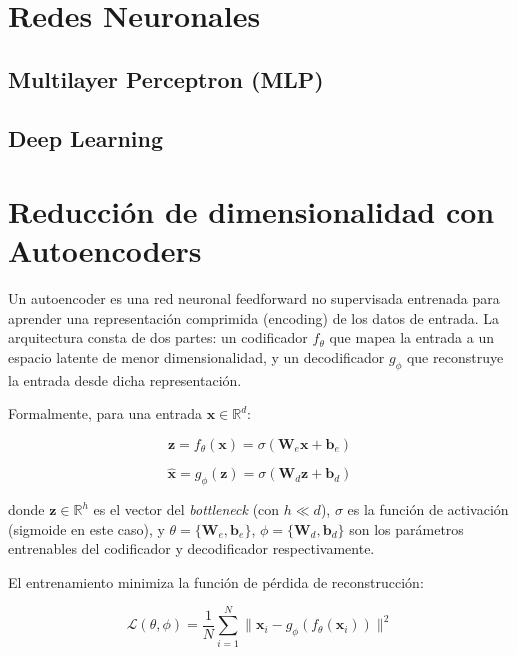 \documentclass[11pt, a4paper]{article}
\begin{document}
\section{Redes Neuronales}

\subsection{Multilayer Perceptron (MLP)}

\subsection{Deep Learning}

\section{Reducción de dimensionalidad con Autoencoders}

Un autoencoder es una red neuronal feedforward no supervisada entrenada para aprender una representación comprimida (encoding) de los datos de entrada. La arquitectura consta de dos partes: un codificador $f_\theta$ que mapea la entrada a un espacio latente de menor dimensionalidad, y un decodificador $g_\phi$ que reconstruye la entrada desde dicha representación.

Formalmente, para una entrada $\mathbf{x} \in \mathbb{R}^d$:

\begin{equation}
\mathbf{z} = f_\theta(\mathbf{x}) = \sigma(\mathbf{W}_e \mathbf{x} + \mathbf{b}_e)
\end{equation}

\begin{equation}
\hat{\mathbf{x}} = g_\phi(\mathbf{z}) = \sigma(\mathbf{W}_d \mathbf{z} + \mathbf{b}_d)
\end{equation}

 donde $\mathbf{z} \in \mathbb{R}^h$ es el vector del \textit{bottleneck} (con $h \ll d$), $\sigma$ es la función de activación (sigmoide en este caso), y $\theta = \{\mathbf{W}_e, \mathbf{b}_e\}$, $\phi = \{\mathbf{W}_d, \mathbf{b}_d\}$ son los parámetros entrenables del codificador y decodificador respectivamente.

El entrenamiento minimiza la función de pérdida de reconstrucción:

\begin{equation}
\mathcal{L}(\theta, \phi) = \frac{1}{N} \sum_{i=1}^{N} \|\mathbf{x}_i - g_\phi(f_\theta(\mathbf{x}_i))\|^2
\end{equation}
\end{document}
